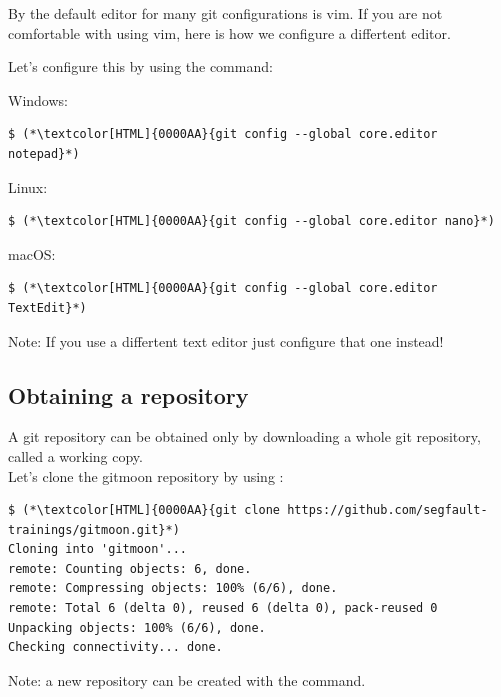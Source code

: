 \begin{frame}[fragile]
  \subslidetitle
  By the default editor for many git configurations is vim.
  If you are not comfortable with using vim, here is how we configure a differtent editor.

  \vspace{1em}
  Let's configure this by using the  command: \\
  \vspace{1em}

  Windows:
  \begin{lstlisting}
$ (*\textcolor[HTML]{0000AA}{git config --global core.editor notepad}*)
\end{lstlisting}
  \vspace{1em}
  Linux:
  \begin{lstlisting}
$ (*\textcolor[HTML]{0000AA}{git config --global core.editor nano}*)
\end{lstlisting}
  \vspace{1em}
  macOS:
  \begin{lstlisting}
$ (*\textcolor[HTML]{0000AA}{git config --global core.editor TextEdit}*)
\end{lstlisting}

  \vspace{1em}
  Note: If you use a differtent text editor just configure that one instead!

\end{frame}

\subsection{Obtaining a repository}
\begin{frame}[fragile]
  \subslidetitle
  A git repository can be obtained only by downloading a whole git repository,
  called a working copy.
  \\
  \vspace{1em}
  Let's clone the gitmoon repository by using :
  \begin{lstlisting}
$ (*\textcolor[HTML]{0000AA}{git clone https://github.com/segfault-trainings/gitmoon.git}*)
Cloning into 'gitmoon'...
remote: Counting objects: 6, done.
remote: Compressing objects: 100% (6/6), done.
remote: Total 6 (delta 0), reused 6 (delta 0), pack-reused 0
Unpacking objects: 100% (6/6), done.
Checking connectivity... done.
\end{lstlisting}

  \vspace{1em}
  Note: a new repository can be created with the  command.
\end{frame}

